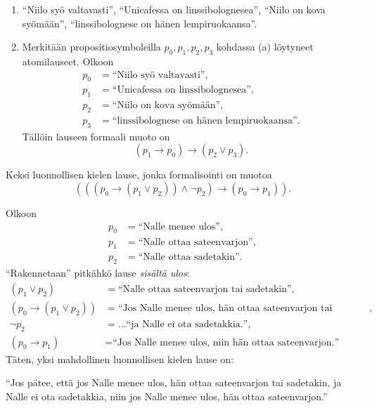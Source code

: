 \documentclass[12pt,a4paper]{article}
\begin{document}
\begin{solution}
\leavevmode\par
\begin{enumerate}[label=\alph*), nosep]
\item ``Niilo syö valtavasti'', ``Unicafessa on linssibolognesea'',
``Niilo on kova syömään'', ``linssibolognese on hänen lempiruokaansa''.

\item Merkitään propositiosymboleilla \(p_0,p_1,p_2,p_3\) kohdassa (a)
löytyneet atomilauseet. Olkoon
\[
\begin{aligned}
  p_0 &= \text{``Niilo syö valtavasti''},\\
  p_1 &= \text{``Unicafessa on linssibolognesea''},\\
  p_2 &= \text{``Niilo on kova syömään''},\\
  p_3 &= \text{``linssibolognese on hänen lempiruokaansa''}.
\end{aligned}
\]
Tällöin lauseen formaali muoto on
\[
(p_1 \to p_0) \to (p_2 \lor p_3).
\]
\end{enumerate}
\end{solution}

\begin{exercise}
Keksi luonnollisen kielen lause, jonka formalisointi on muotoa
\[(((p_0 \rightarrow (p_1 \lor p_2)) \land \neg p_2) \rightarrow (p_0
\rightarrow p_1)).\]
\end{exercise}

\begin{solution}
Olkoon
\[
\begin{aligned}
p_0 &= \text{``Nalle menee ulos''}, \\
p_1 &= \text{``Nalle ottaa sateenvarjon''}, \\
p_2 &= \text{``Nalle ottaa sadetakin''}.
\end{aligned}
\]
``Rakennetaan'' pitkähkö lause \emph{sisältä ulos}:
\[
\begin{aligned}
(p_1 \lor p_2) &= \text{``Nalle ottaa sateenvarjon tai sadetakin''}, \\
(p_0 \rightarrow (p_1 \lor p_2)) &= \text{``Jos Nalle menee ulos, hän
ottaa sateenvarjon tai sadetakin''}, \\
\neg p_2 &= \dots \text{``ja Nalle ei ota sadetakkia.''}, \\
(p_0 \rightarrow p_1) &= \text{``Jos Nalle menee ulos, niin hän ottaa
sateenvarjon.''}
\end{aligned}
\]
Täten, yksi mahdollinen luonnollisen kielen lause on:

``Jos pätee, että jos Nalle menee ulos, hän ottaa sateenvarjon tai
sadetakin, ja Nalle ei ota sadetakkia, niin jos Nalle menee ulos,
hän ottaa sateenvarjon.''
\end{solution}
\end{document}
